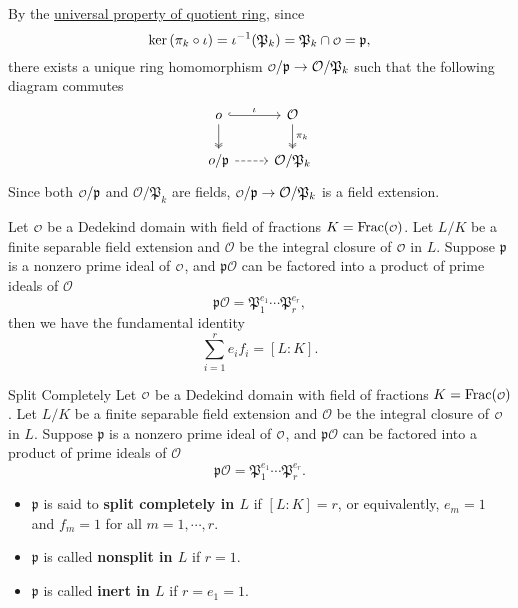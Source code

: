 \begin{prf}
    By the \hyperref[th:universal_property_of_quotient_ring]{universal property of quotient ring}, since 
    \[
    \ker \left( \pi_k\circ \iota\right)=\iota^{-1}(\mathfrak{P}_k)=\mathfrak{P}_k \cap \mathcalo=\mathfrak{p},
    \]
    there exists a unique ring homomorphism $\mathcalo/\mathfrak{p}\to \mathcal{O}/\mathfrak{P}_k$ such that the following diagram commutes
    \[
        \begin{tikzcd}
            o \arrow[r, "\iota", hook] \arrow[d, two heads] & \mathcal{O} \arrow[d, "\pi_k", two heads] \\
            o/\mathfrak{p} \arrow[r, dashed]                & \mathcal{O}/\mathfrak{P}_k               
            \end{tikzcd}
    \]
    Since both $\mathcalo/\mathfrak{p}$ and $\mathcal{O}/\mathfrak{P}_k$ are fields, $\mathcalo/\mathfrak{p}\to \mathcal{O}/\mathfrak{P}_k$ is a field extension.
\end{prf}


\begin{proposition}{}{}
    Let $\mathcalo$ be a Dedekind domain with field of fractions $K=\mathrm{Frac}(\mathcalo)$. Let $L/K$ be a finite separable field extension and $\mathcal{O}$ be the integral closure of $\mathcalo$ in $L$. Suppose $\mathfrak{p}$ is a nonzero prime ideal of $\mathcalo$, and $\mathfrak{p}\mathcal{O}$ can be factored into a product of prime ideals of $\mathcal{O}$ 
    \[
    \mathfrak{p}\mathcal{O}=\mathfrak{P}_1^{e_1}\cdots\mathfrak{P}_r^{e_r},
    \]
    then we have the fundamental identity
    \[
    \sum_{i=1}^r e_i f_i=[L:K].
    \]
 
\end{proposition}
\begin{definition}{Split Completely}{}
    Let $\mathcalo$ be a Dedekind domain with field of fractions $K=\mathrm{Frac}(\mathcalo)$. Let $L/K$ be a finite separable field extension and $\mathcal{O}$ be the integral closure of $\mathcalo$ in $L$. Suppose $\mathfrak{p}$ is a nonzero prime ideal of $\mathcalo$, and $\mathfrak{p}\mathcal{O}$ can be factored into a product of prime ideals of $\mathcal{O}$ 
    \[
    \mathfrak{p}\mathcal{O}=\mathfrak{P}_1^{e_1}\cdots\mathfrak{P}_r^{e_r}.
    \]
    \begin{itemize}
        \item $\mathfrak{p}$ is said to \textbf{split completely in $L$} if $[L:K]=r$, or equivalently, $e_m=1$ and $f_m=1$ for all $m = 1,\cdots,r$.
        \item $\mathfrak{p}$ is called \textbf{nonsplit in $L$} if $r=1$.
        \item $\mathfrak{p}$ is called \textbf{inert in $L$} if $r=e_1=1$.
    \end{itemize}
    
\end{definition}


